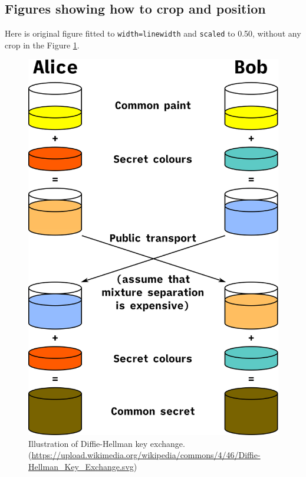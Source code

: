 \subsection{Figures showing how to crop and position} 

Here is original figure fitted to \verb|width=linewidth| and \verb|scaled| to 0.50, without any crop in the Figure \ref{fig:diffie-hellman-illus}.
\begin{figure}[!h]
    \centering
    \includegraphics[width=\linewidth,scale=0.50]{sections/acm-template-sections/images/Diffie-Hellman_Key_Exchange.svg.png}
    \caption{Illustration of Diffie-Hellman key exchange. (\url{https://upload.wikimedia.org/wikipedia/commons/4/46/Diffie-Hellman_Key_Exchange.svg})}
    \label{fig:diffie-hellman-illus}
\end{figure}

